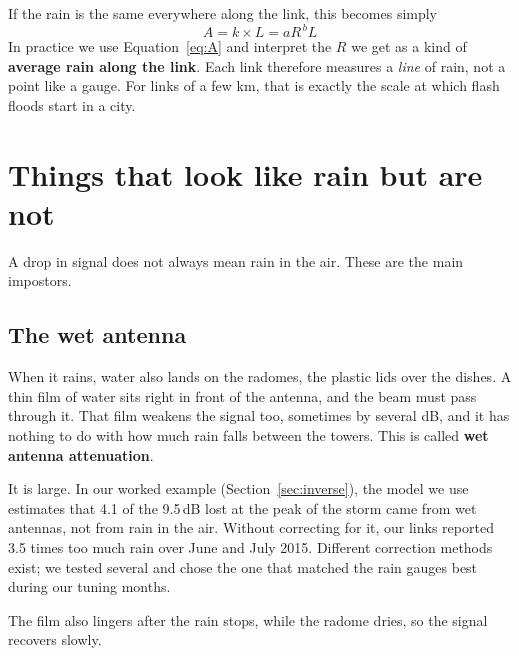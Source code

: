 \documentclass[11pt,a4paper]{article}
\begin{document}
If the rain is the same everywhere along the link, this becomes simply
\begin{equation}
A = k \times L = a R^{\,b} L
\label{eq:A}
\end{equation}
In practice we use Equation~\ref{eq:A} and interpret the $R$ we get as a kind of \textbf{average rain along the
link}. Each link therefore measures a \emph{line} of rain, not a point like a gauge. For links of a few km,
that is exactly the scale at which flash floods start in a city.

\section{Things that look like rain but are not}
\label{sec:fakes}

A drop in signal does not always mean rain in the air. These are the main impostors.

\subsection{The wet antenna}

When it rains, water also lands on the radomes, the plastic lids over the dishes. A thin film of
water sits right in front of the antenna, and the beam must pass through it. That film weakens the
signal too, sometimes by several dB, and it has nothing to do with how much rain falls between the
towers. This is called \textbf{wet antenna attenuation}.

It is large. In our worked example (Section~\ref{sec:inverse}), the model we use estimates that 4.1 of the
9.5\,dB lost at the peak of the storm came from wet antennas, not from rain in the air. Without correcting for it,
our links reported 3.5 times too much rain over June and July 2015. Different correction methods exist; we tested
several and chose the one that matched the rain gauges best during our tuning months.

The film also lingers after the rain stops, while the radome dries, so the signal recovers slowly.
\end{document}
